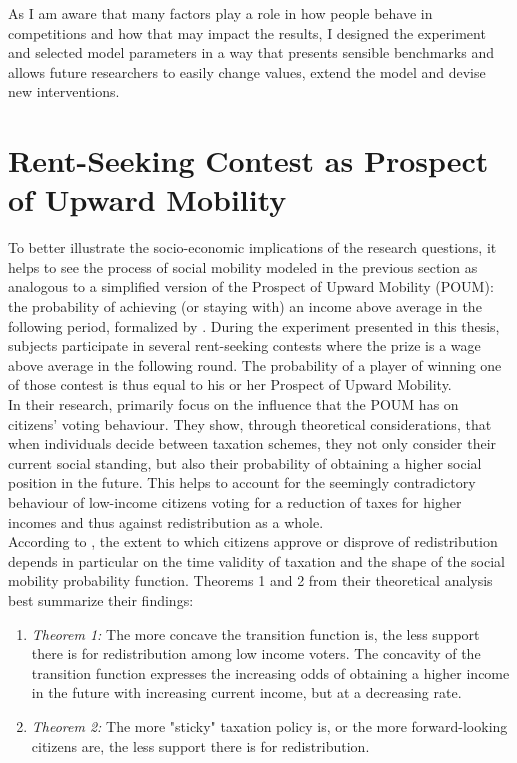 As I am aware that many factors play a role in how people behave in competitions and how that may impact the results, I designed the experiment and selected model parameters in a way that presents sensible benchmarks and allows future researchers to easily change values, extend the model and devise new interventions.\\ 

\section{Rent-Seeking Contest as Prospect of Upward Mobility}
\label{sec:poum}

To better illustrate the socio-economic implications of the research questions, it helps to see the process of social mobility modeled in the previous section as analogous to a simplified version of the Prospect of Upward Mobility (POUM): the probability of achieving (or staying with) an income above average in the following period, formalized by \cite{benabou2001}. During the experiment presented in this thesis, subjects participate in several rent-seeking contests where the prize is a wage above average in the following round. The probability of a player of winning one of those contest is thus equal to his or her Prospect of Upward Mobility.\\

In their research, \cite{benabou2001} primarily focus on the influence that the POUM has on citizens' voting behaviour. They show, through theoretical considerations, that when individuals decide between taxation schemes, they not only consider their current social standing, but also their probability of obtaining a higher social position in the future. This helps to account for the seemingly contradictory behaviour of low-income citizens voting for a reduction of taxes for higher incomes and thus against redistribution as a whole.\\

According to \citeauthor{benabou2001}, the extent to which citizens approve or disprove of redistribution depends in particular on the time validity of taxation and the shape of the social mobility probability function. Theorems 1 and 2 from their theoretical analysis best summarize their findings:\\
\begin{enumerate}
    \item \textit{Theorem 1:} The more concave the transition function is, the less support there is for redistribution among low income voters. The concavity of the transition function expresses the increasing odds of obtaining a higher income in the future with increasing current income, but at a decreasing rate.  
    \item \textit{Theorem 2:} The more "sticky" taxation policy is, or the more forward-looking citizens are, the less support there is for redistribution.
\end{enumerate}

